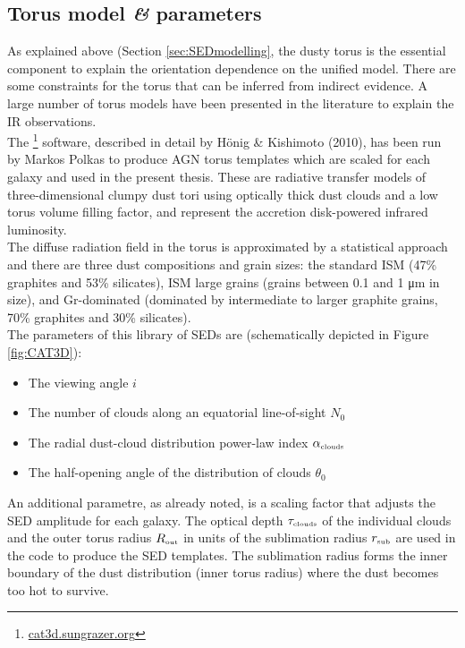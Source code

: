 \subsection{Torus model \textit{\&} parameters}
As explained above (Section \ref{sec:SEDmodelling}, the dusty torus is the essential component to explain the orientation dependence on the unified model. There are some constraints for the torus that can be inferred from indirect evidence. A large number of torus models have been presented in the literature to explain the IR observations.\\
The \footnote{\url{cat3d.sungrazer.org}} software, described in detail by H{\"o}nig \& Kishimoto (2010)\cite{HonigKishi2010}, has been run by Markos Polkas to produce AGN torus templates which are scaled for each galaxy and used in the present thesis. These are radiative transfer models of three-dimensional clumpy dust tori using optically thick dust clouds and a low torus volume filling factor, and represent the accretion disk-powered infrared luminosity.\\
The diffuse radiation field in the torus is approximated by a statistical approach and there are three dust compositions and grain sizes: the standard ISM (47\% graphites and 53\% silicates), ISM large grains (grains between 0.1 and 1 μm in size), and Gr-dominated (dominated by intermediate to larger graphite grains, 70\% graphites and 30\% silicates). \\
The parameters of this library of SEDs are (schematically depicted in Figure \ref{fig:CAT3D}):  
\begin{itemize}
    \item The viewing angle $i$
    \item The number of clouds along an equatorial line-of-sight $N_0$
    \item The radial dust-cloud distribution power-law index $\alpha_{\mbox{\tiny{clouds}}}$
    \item The half-opening angle of the distribution of clouds $\theta_0$
\end{itemize}
An additional parametre, as already noted, is a scaling factor that adjusts the SED amplitude for each galaxy. The optical depth $\tau_{\mbox{\tiny{clouds}}}$ of the individual clouds and the outer torus radius $R_{\mbox{\tiny{out}}}$ in units of the sublimation radius $r_{\mbox{\tiny{sub}}}$ are used in the  code to produce the SED templates. The sublimation radius forms the inner boundary of the dust distribution (inner torus radius) where the dust becomes too hot to survive. 
